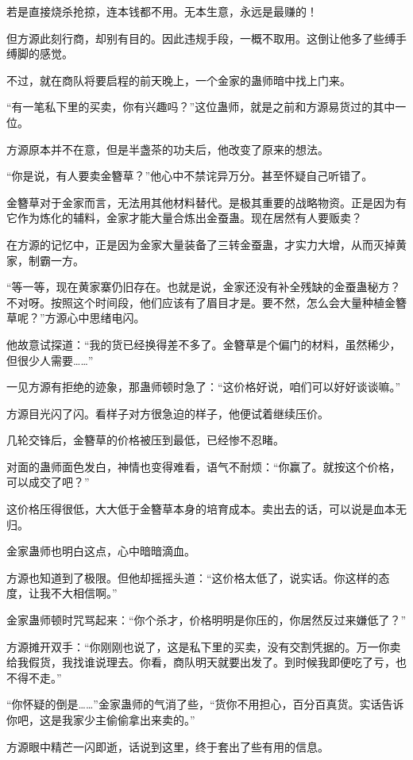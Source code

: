 \begin{this_body}
若是直接烧杀抢掠，连本钱都不用。无本生意，永远是最赚的！

但方源此刻行商，却别有目的。因此违规手段，一概不取用。这倒让他多了些缚手缚脚的感觉。

不过，就在商队将要启程的前天晚上，一个金家的蛊师暗中找上门来。

“有一笔私下里的买卖，你有兴趣吗？”这位蛊师，就是之前和方源易货过的其中一位。

方源原本并不在意，但是半盏茶的功夫后，他改变了原来的想法。

“你是说，有人要卖金簪草？”他心中不禁诧异万分。甚至怀疑自己听错了。

金簪草对于金家而言，无法用其他材料替代。是极其重要的战略物资。正是因为有它作为炼化的辅料，金家才能大量合炼出金蚕蛊。现在居然有人要贩卖？

在方源的记忆中，正是因为金家大量装备了三转金蚕蛊，才实力大增，从而灭掉黄家，制霸一方。

“等一等，现在黄家寨仍旧存在。也就是说，金家还没有补全残缺的金蚕蛊秘方？不对呀。按照这个时间段，他们应该有了眉目才是。要不然，怎么会大量种植金簪草呢？”方源心中思绪电闪。

他故意试探道：“我的货已经换得差不多了。金簪草是个偏门的材料，虽然稀少，但很少人需要……”

一见方源有拒绝的迹象，那蛊师顿时急了：“这价格好说，咱们可以好好谈谈嘛。”

方源目光闪了闪。看样子对方很急迫的样子，他便试着继续压价。

几轮交锋后，金簪草的价格被压到最低，已经惨不忍睹。

对面的蛊师面色发白，神情也变得难看，语气不耐烦：“你赢了。就按这个价格，可以成交了吧？”

这价格压得很低，大大低于金簪草本身的培育成本。卖出去的话，可以说是血本无归。

金家蛊师也明白这点，心中暗暗滴血。

方源也知道到了极限。但他却摇摇头道：“这价格太低了，说实话。你这样的态度，让我不大相信啊。”

金家蛊师顿时咒骂起来：“你个杀才，价格明明是你压的，你居然反过来嫌低了？”

方源摊开双手：“你刚刚也说了，这是私下里的买卖，没有交割凭据的。万一你卖给我假货，我找谁说理去。你看，商队明天就要出发了。到时候我即便吃了亏，也不得不走。”

“你怀疑的倒是……”金家蛊师的气消了些，“货你不用担心，百分百真货。实话告诉你吧，这是我家少主偷偷拿出来卖的。”

方源眼中精芒一闪即逝，话说到这里，终于套出了些有用的信息。


\end{this_body}
